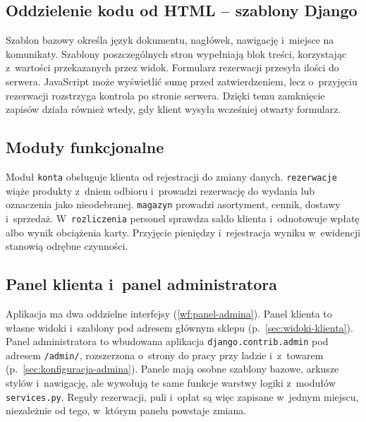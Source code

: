 \documentclass[12pt,a4paper,oneside]{article}
\newcounter{pu}
\begin{document}
\subsection{Oddzielenie kodu od HTML -- szablony Django}

Szablon bazowy określa język dokumentu, nagłówek, nawigację i~miejsce na komunikaty. Szablony poszczególnych stron wypełniają blok treści, korzystając z~wartości przekazanych przez widok. Formularz rezerwacji przesyła ilości do serwera. JavaScript może wyświetlić sumę przed zatwierdzeniem, lecz o~przyjęciu rezerwacji rozstrzyga kontrola po stronie serwera. Dzięki temu zamknięcie zapisów działa również wtedy, gdy klient wysyła wcześniej otwarty formularz.


\subsection{Moduły funkcjonalne}

Moduł \texttt{konta} obsługuje klienta od rejestracji do zmiany danych. \texttt{rezerwacje} wiąże produkty z~dniem odbioru i~prowadzi rezerwację do wydania lub oznaczenia jako nieodebranej. \texttt{magazyn} prowadzi asortyment, cennik, dostawy i~sprzedaż. W~\texttt{rozliczenia} personel sprawdza saldo klienta i~odnotowuje wpłatę albo wynik obciążenia karty. Przyjęcie pieniędzy i~rejestracja wyniku w~ewidencji stanowią odrębne czynności.


\subsection{Panel klienta i~panel administratora}
\label{sec:panele}

Aplikacja ma dwa oddzielne interfejsy (\ref{wf:panel-admina}). Panel klienta to własne widoki i~szablony pod adresem głównym sklepu (p.~\ref{sec:widoki-klienta}). Panel administratora to wbudowana aplikacja \texttt{django.contrib.admin} pod adresem \texttt{/admin/}, rozszerzona o~strony do pracy przy ladzie i~z~towarem (p.~\ref{sec:konfiguracja-admina}). Panele mają osobne szablony bazowe, arkusze stylów i~nawigację, ale wywołują te same funkcje warstwy logiki z~modułów \texttt{services.py}. Reguły rezerwacji, puli i~opłat są więc zapisane w~jednym miejscu, niezależnie od tego, w~którym panelu powstaje zmiana.
\end{document}
